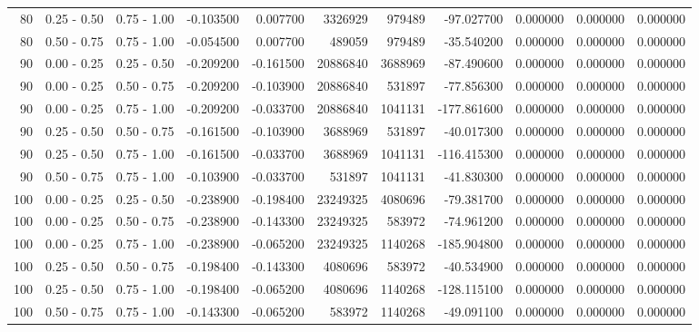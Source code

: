 \begin{table}
\begin{tabular}{rllrrrrrrrr}
80 & 0.25 - 0.50 & 0.75 - 1.00 & -0.103500 & 0.007700 & 3326929 & 979489 & -97.027700 & 0.000000 & 0.000000 & 0.000000 \\
80 & 0.50 - 0.75 & 0.75 - 1.00 & -0.054500 & 0.007700 & 489059 & 979489 & -35.540200 & 0.000000 & 0.000000 & 0.000000 \\
90 & 0.00 - 0.25 & 0.25 - 0.50 & -0.209200 & -0.161500 & 20886840 & 3688969 & -87.490600 & 0.000000 & 0.000000 & 0.000000 \\
90 & 0.00 - 0.25 & 0.50 - 0.75 & -0.209200 & -0.103900 & 20886840 & 531897 & -77.856300 & 0.000000 & 0.000000 & 0.000000 \\
90 & 0.00 - 0.25 & 0.75 - 1.00 & -0.209200 & -0.033700 & 20886840 & 1041131 & -177.861600 & 0.000000 & 0.000000 & 0.000000 \\
90 & 0.25 - 0.50 & 0.50 - 0.75 & -0.161500 & -0.103900 & 3688969 & 531897 & -40.017300 & 0.000000 & 0.000000 & 0.000000 \\
90 & 0.25 - 0.50 & 0.75 - 1.00 & -0.161500 & -0.033700 & 3688969 & 1041131 & -116.415300 & 0.000000 & 0.000000 & 0.000000 \\
90 & 0.50 - 0.75 & 0.75 - 1.00 & -0.103900 & -0.033700 & 531897 & 1041131 & -41.830300 & 0.000000 & 0.000000 & 0.000000 \\
100 & 0.00 - 0.25 & 0.25 - 0.50 & -0.238900 & -0.198400 & 23249325 & 4080696 & -79.381700 & 0.000000 & 0.000000 & 0.000000 \\
100 & 0.00 - 0.25 & 0.50 - 0.75 & -0.238900 & -0.143300 & 23249325 & 583972 & -74.961200 & 0.000000 & 0.000000 & 0.000000 \\
100 & 0.00 - 0.25 & 0.75 - 1.00 & -0.238900 & -0.065200 & 23249325 & 1140268 & -185.904800 & 0.000000 & 0.000000 & 0.000000 \\
100 & 0.25 - 0.50 & 0.50 - 0.75 & -0.198400 & -0.143300 & 4080696 & 583972 & -40.534900 & 0.000000 & 0.000000 & 0.000000 \\
100 & 0.25 - 0.50 & 0.75 - 1.00 & -0.198400 & -0.065200 & 4080696 & 1140268 & -128.115100 & 0.000000 & 0.000000 & 0.000000 \\
100 & 0.50 - 0.75 & 0.75 - 1.00 & -0.143300 & -0.065200 & 583972 & 1140268 & -49.091100 & 0.000000 & 0.000000 & 0.000000 \\
\bottomrule
\end{tabular}
\end{table}
